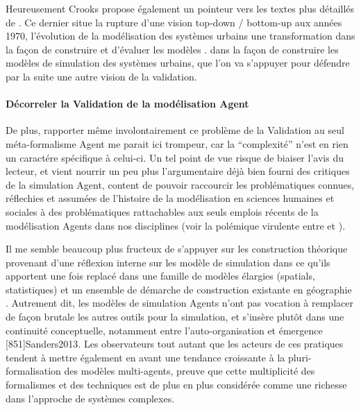 Heureusement Crooks propose également un pointeur vers les textes plus détaillés de \textcite{Batty2001, Batty2005b}. Ce dernier situe la rupture d'une vision top-down / bottom-up aux années 1970, l'évolution de la modélisation des systèmes urbains une transformation dans la façon de construire et d'évaluer les modèles .     dans la façon de construire les modèles de simulation des systèmes urbains, que l'on va s'appuyer pour défendre par la suite une autre vision de la validation.

\paragraph{Décorreler la Validation de la modélisation Agent}
\label{decorreler_validation}

De plus, rapporter même involontairement ce problème de la Validation au seul méta-formalisme Agent me parait ici trompeur, car la \enquote{complexité} n'est en rien un caractére spécifique à celui-ci. Un tel point de vue risque de biaiser l'avis du lecteur, et vient nourrir un peu plus l'argumentaire déjà bien fourni des critiques de la simulation Agent, content de pouvoir raccourcir les problématiques connues, réflechies et assumées de l'histoire de la modélisation en sciences humaines et sociales à des problématiques rattachables aux seuls emplois récents de la modélisation Agents dans nos disciplines (voir la polémique virulente entre \textcite{Yanoff2008} et \textcites{Elsenbroich2012,Chattoe2011}).

Il me semble beaucoup plus fructeux de s'appuyer sur les construction théorique provenant d'une réflexion interne sur les modèle de simulation dans ce qu'ils apportent une fois replacé dans une famille de modèles élargies (spatials, statistiques) et un ensemble de démarche de construction existante en géographie \autocites{Geopoint2000, Mathian2014, Sanders2007}. Autrement dit, les modèles de simulation Agents n'ont pas vocation à remplacer de façon brutale les autres outils pour la simulation, et s'insère plutôt dans une continuité conceptuelle, notamment entre l'auto-organisation et émergence \autocite{Pumain2013}[851]{Sanders2013}. Les observateurs \autocite{Varenne} tout autant que les acteurs \autocite{Sanders2013}  de ces pratiques tendent à mettre également en avant une tendance croissante à la pluri-formalisation des modèles multi-agents, preuve que cette multiplicité des formalismes et des techniques est de plus en plus considérée comme une richesse dans l'approche de systèmes complexes.

